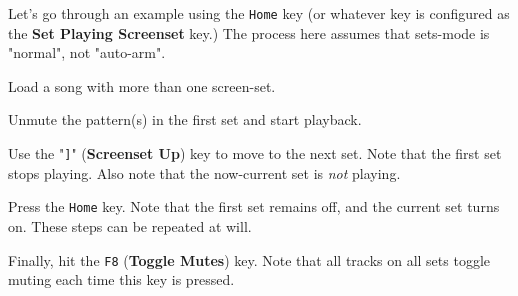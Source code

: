    Let's go through an example using the \texttt{Home} key (or whatever key is
   configured as the \textbf{Set Playing Screenset} key.)
   The process here assumes that sets-mode is "normal", not "auto-arm".

   \begin{enumber}
      \item Load a song with more than one screen-set.
      \item Unmute the pattern(s) in the first set and start playback.
      \item Use the "\texttt{]}" (\textbf{Screenset Up}) key to move to the next
         set.  Note that the first set stops playing.  Also note that the
         now-current set is \textsl{not} playing.
      \item Press the \texttt{Home} key.
         Note that the first set remains off, and the current set turns on.
         These steps can be repeated at will.
      \item Finally, hit the \texttt{F8} (\textbf{Toggle Mutes}) key.
         Note that all tracks on all sets toggle muting each time this key is
         pressed.
   \end{enumber}

